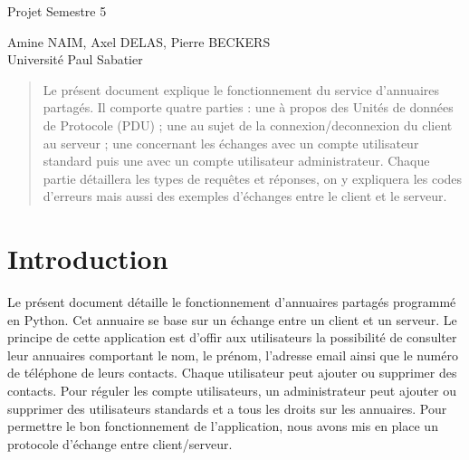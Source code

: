 \documentclass[10pt]{article}
\newcommand{\rfcAuthor}{Amine NAIM, Axel DELAS, Pierre BECKERS}
\newcommand{\rfcInstitution}{Université Paul Sabatier}
\begin{document}
\begin{multicols}{2}
	\begin{flushleft}
		Projet Semestre 5
	\end{flushleft}
\columnbreak
	\begin{flushright}
		\rfcAuthor \\
		\rfcInstitution
	\end{flushright}
\end{multicols}

\vspace{1in} { \center } \vspace{1in}

\begin{abstract}
	Le présent document explique le fonctionnement du service d'annuaires partagés. Il comporte quatre parties : une à propos des Unités de données de Protocole (PDU) ; une au sujet de la connexion/deconnexion du client au serveur ; une concernant les échanges avec un compte utilisateur standard puis une avec un compte utilisateur administrateur. Chaque partie détaillera les types de requêtes et réponses, on y expliquera les codes d'erreurs mais aussi des exemples d'échanges entre le client et le serveur.
\end{abstract}
\pagebreak

\tableofcontents
\pagebreak

\section{Introduction}{
    Le présent document détaille le fonctionnement d'annuaires partagés programmé en Python. Cet annuaire se base sur un échange entre un client et un serveur. Le principe de cette application est d'offir aux utilisateurs la possibilité de consulter leur annuaires comportant le nom, le prénom, l'adresse email ainsi que le numéro de téléphone de leurs contacts. Chaque utilisateur peut ajouter ou supprimer des contacts. Pour réguler les compte utilisateurs, un administrateur peut ajouter ou supprimer des utilisateurs standards et a tous les droits sur les annuaires. Pour permettre le bon fonctionnement de l'application, nous avons mis en place un protocole d'échange entre client/serveur.

}
\pagebreak
\end{document}
